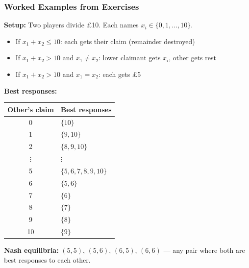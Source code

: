 \bigseparator

\subsubsection{Worked Examples from Exercises}

\begin{exbox}
\textbf{Setup:} Two players divide £10. Each names $x_i \in \{0, 1, \ldots, 10\}$.
\begin{itemize}
  \item If $x_1 + x_2 \leq 10$: each gets their claim (remainder destroyed)
  \item If $x_1 + x_2 > 10$ and $x_1 \neq x_2$: lower claimant gets $x_i$, other gets rest
  \item If $x_1 + x_2 > 10$ and $x_1 = x_2$: each gets £5
\end{itemize}

\textbf{Best responses:}
\begin{center}
\renewcommand{\arraystretch}{1.2}
\begin{tabular}{@{} c l @{}}
\toprule
\textbf{Other's claim} & \textbf{Best responses} \\
\midrule
0 & $\{10\}$ \\
1 & $\{9, 10\}$ \\
2 & $\{8, 9, 10\}$ \\
$\vdots$ & $\vdots$ \\
5 & $\{5, 6, 7, 8, 9, 10\}$ \\
6 & $\{5, 6\}$ \\
7 & $\{6\}$ \\
8 & $\{7\}$ \\
9 & $\{8\}$ \\
10 & $\{9\}$ \\
\bottomrule
\end{tabular}
\end{center}

\textbf{Nash equilibria:} $(5,5)$, $(5,6)$, $(6,5)$, $(6,6)$ --- any pair where both are best responses to each other.
\end{exbox}

